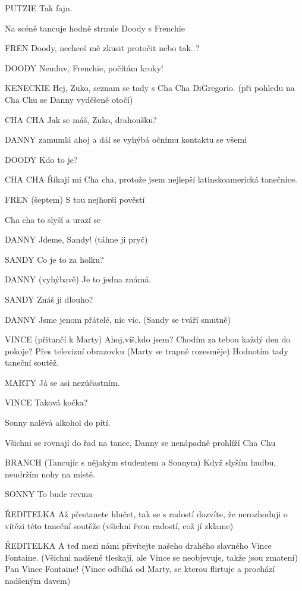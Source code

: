 PUTZIE        Tak fajn. 

Na scéně tancuje hodně strnule Doody s Frenchie

FREN        Doody, nechceš mě zkusit protočit nebo tak..?

DOODY        Nemluv, Frenchie, počítám kroky! 

KENECKIE        Hej, Zuko, seznam se tady s Cha Cha DiGregorio. (při pohledu na Cha         Chu se Danny vyděšeně otočí)

CHA CHA         Jak se máš, Zuko, drahoušku?

DANNY        zamumlá ahoj a dál se vyhýbá očnímu kontaktu se všemi 

DOODY        Kdo to je? 

CHA CHA        Říkají mi Cha cha, protože jsem nejlepší latinskoamerická tanečnice. 

FREN        (šeptem) S tou nejhorší pověstí

Cha cha to slyší a urazí se 

DANNY        Jdeme, Sandy! (táhne ji pryč)

SANDY         Co je to za holku? 

DANNY        (vyhýbavě) Je to jedna známá.  

SANDY        Znáš ji dlouho? 

DANNY        Jsme jenom přátelé, nic víc. (Sandy se tváří smutně) 

VINCE        (přitančí k Marty) Ahoj,víš,kdo jsem? Chodím za tebou každý den do pokoje? Přes televizní obrazovku (Marty se trapně rozesměje) Hodnotím tady taneční soutěž. 

MARTY        Já se asi nezúčastním.

VINCE        Taková kočka? 

Sonny nalévá alkohol do pití.

Všichni se rovnají do řad na tanec, Danny se nenápadně prohlíží Cha Chu 

BRANCH (Tancujíc s nějakým studentem a Sonnym) Když slyším hudbu, neudržím nohy na místě. 

SONNY        To bude revma

ŘEDITELKA         Až přestanete hlučet, tak se s radostí dozvíte, že nerozhoduji o vítězi této taneční soutěže (všichni řvou radostí, což jí zklame) 

ŘEDITELKA        A teď mezi námi přivítejte našeho drahého slavného Vince Fontaine. (Všichni nadšeně tleskají, ale Vince se neobjevuje, takže jsou zmatení) Pan Vince Fontaine! (Vince odbíhá od Marty, se kterou flirtuje a prochází nadšeným davem) 

